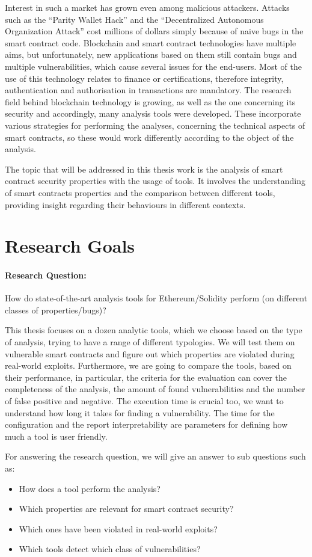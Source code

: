 Interest in such a market has grown even among malicious attackers. 
Attacks such as the “Parity Wallet Hack” and the “Decentralized Autonomous Organization Attack” cost millions of dollars simply because of 
naive bugs in the smart contract code. Blockchain and smart contract technologies have multiple aims, but unfortunately, new applications 
based on them still contain bugs and multiple vulnerabilities, which cause 
several issues for the end-users. Most of the use of this technology relates to finance or certifications, therefore integrity, 
authentication and authorisation in transactions are mandatory. The research field behind blockchain technology is growing, as well as the one concerning 
its security and accordingly, many analysis tools were developed. 
These incorporate various strategies for performing the analyses, concerning the technical aspects of smart contracts, 
so these would work differently according to the object of the analysis. 

The topic that will be addressed in this thesis work is the analysis of smart contract security properties with the usage of tools. 
It involves the understanding of smart contracts properties and the comparison between different tools, 
providing insight regarding their behaviours in different contexts.


\section{Research Goals}
\label{sec:Introduction:ResearchGoals}
\paragraph{Research Question:} 
How do state-of-the-art analysis tools for Ethereum/Solidity perform (on different classes of properties/bugs)?

This thesis focuses on a dozen analytic tools, which we choose based on the type of analysis, trying to have a range of different typologies. 
We will test them on vulnerable smart contracts and figure out which properties are violated during real-world exploits. 
Furthermore, we are going to compare the tools, based on their performance, in particular, the criteria for the evaluation can cover the completeness of the analysis, the amount of found vulnerabilities and the number of false positive and negative. 
The execution time is crucial too, we want to understand how long it takes for finding a vulnerability. The time for the configuration and the report interpretability are parameters for defining how much a tool is user friendly. 

For answering the research question, we will give an answer to sub questions such as: 
\begin{itemize}
  \item How does a tool perform the analysis? 
  \item Which properties are relevant for smart contract security?
  \item Which ones have been violated in real-world exploits? 
  \item Which tools detect which class of vulnerabilities? 
\end{itemize}
